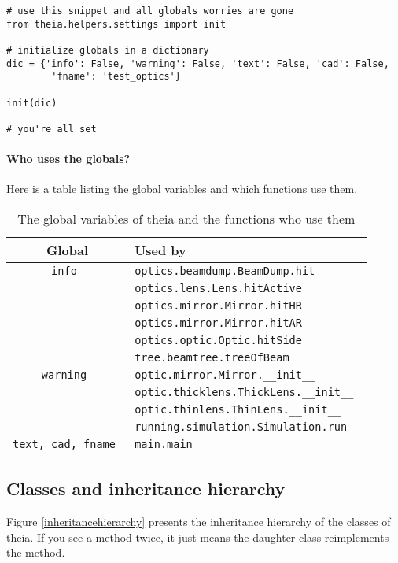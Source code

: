 \documentclass{article}
\begin{document}
\begin{lstlisting}
# use this snippet and all globals worries are gone
from theia.helpers.settings import init

# initialize globals in a dictionary
dic = {'info': False, 'warning': False, 'text': False, 'cad': False,
		'fname': 'test_optics'}

init(dic)

# you're all set 
\end{lstlisting}

\paragraph{Who uses the globals?}Here is a table listing the global variables and which functions use them.

\begin{table}[h]
\begin{center}

\begin{tabular}{|c | l |}
\hline
\textbf{Global} & \textbf{Used by} \\ \hline \hline

\tt{info} & \tt{optics.beamdump.BeamDump.hit} \\
& \tt{optics.lens.Lens.hitActive} \\
& \tt{optics.mirror.Mirror.hitHR} \\
& \tt{optics.mirror.Mirror.hitAR} \\
& \tt{optics.optic.Optic.hitSide} \\
& \tt{tree.beamtree.treeOfBeam} \\ \hline

\tt{warning} & \tt{optic.mirror.Mirror.\_\_init\_\_} \\
& \tt{optic.thicklens.ThickLens.\_\_init\_\_} \\
& \tt{optic.thinlens.ThinLens.\_\_init\_\_} \\
& \tt{running.simulation.Simulation.run} \\ \hline

\tt{text, cad, fname} & \tt{main.main} \\ \hline

\end{tabular}
\caption{The global variables of theia and the functions who use them}
\label{globals}
\end{center}
\end{table}
\subsection{Classes and inheritance hierarchy}
Figure \ref{inheritancehierarchy} presents the inheritance hierarchy of the classes of theia. If you see a method twice, it just means the daughter class reimplements the method.
\end{document}
